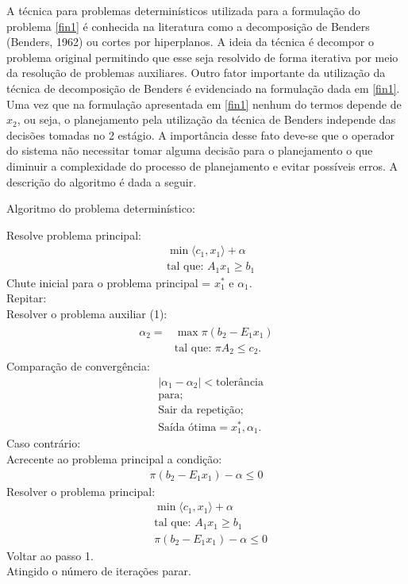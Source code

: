 A t\'ecnica para problemas determin\'isticos utilizada para a formula\c c\~ao do problema \ref{fin1} \'e conhecida na literatura como
a decomposi\c c\~ao de Benders
(Benders, 1962) ou cortes por hiperplanos. A ideia da t\'ecnica \'e decompor o problema original permitindo que esse
seja resolvido de forma iterativa por meio da resolu\c c\~ao de problemas auxiliares. Outro fator importante da
utiliza\c c\~ao da t\'ecnica de decomposi\c c\~ao de Benders \'e evidenciado na formula\c c\~ao dada em \ref{fin1}. Uma
vez que na formula\c c\~ao apresentada em \ref{fin1} nenhum do termos depende de $x_2$, ou seja, o planejamento pela
utiliza\c c\~ao da t\'ecnica de Benders independe das decis\~oes tomadas no 2 est\'agio. A import\^ancia desse fato
deve-se que o operador do sistema n\~ao necessitar tomar alguma decis\~ao para o planejamento o que diminuir a
complexidade do processo de planejamento e evitar poss\'iveis erros.
A descri\c c\~ao do algoritmo \'e
dada a seguir.

\begin{center}
Algoritmo do problema determin\'istico:\\
\end{center}
Resolve problema principal:
\begin{align*}
&\min \langle c_1,x_1\rangle + \alpha \nonumber\\
&\mbox{tal que: }	A_1 x_1 \geq b_1
\end{align*}
Chute inicial para o problema principal = $x_1^{*}$ e $\alpha_1$.\\
Repitar:\\
Resolver  o problema auxiliar (1):
\begin{align*}
  \begin{split}	
 \alpha_2= &\max \pi (b_2 - E_1x_1 ) \\
	&\mbox{tal que: }\pi A_2  \leq c_2.
  \end{split}
\end{align*}
Compara\c c\~ao de converg\^encia:
\begin{align*}
	&|\alpha_1 - \alpha_2|< \mbox{toler\^ancia}\\
	&\mbox{para;}\\
	&\mbox{Sair da repeti\c c\~ao;}\\
	&\mbox{Sa\'ida \'otima} = x_1^{*}, \alpha_1.
\end{align*}
Caso contr\'ario:\\
Acrecente ao problema principal a condi\c c\~ao:
\begin{align*}
\pi(b_2 - E_1x_1) - \alpha \leq 0
\end{align*}
Resolver o problema principal:
\begin{align*}
&\min \langle c_1,x_1\rangle + \alpha \nonumber\\
&\mbox{tal que: }	A_1 x_1 \geq b_1\\
&\pi(b_2 - E_1x_1) - \alpha \leq 0
\end{align*}
Voltar ao passo 1.\\
Atingido o número de itera\c c\~oes parar.\\

